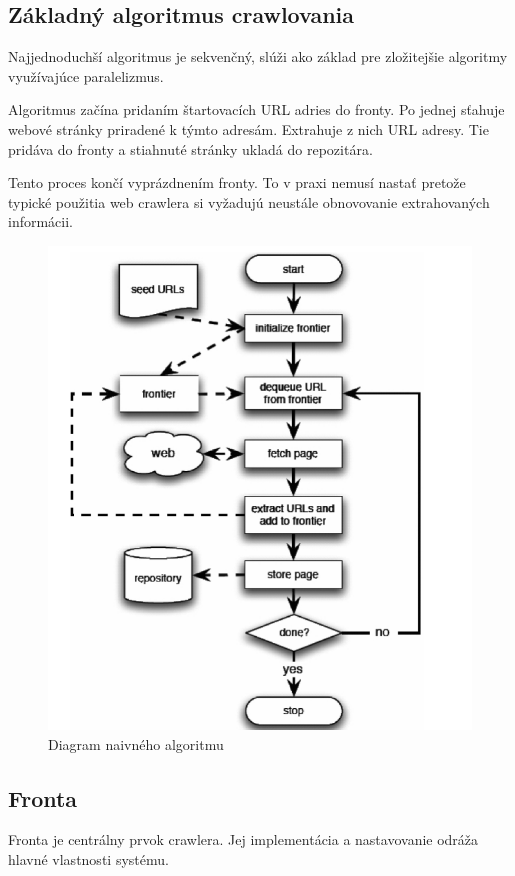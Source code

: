 \subsection{Základný algoritmus crawlovania}
Najjednoduchší algoritmus je sekvenčný, slúži ako základ pre zložitejšie algoritmy využívajúce paralelizmus. 

Algoritmus začína pridaním štartovacích URL adries do fronty. Po jednej sťahuje webové stránky priradené k týmto adresám. Extrahuje z nich URL adresy. Tie pridáva do fronty a stiahnuté stránky ukladá do repozitára.

Tento proces končí vyprázdnením fronty. To v praxi nemusí nastať pretože typické použitia web crawlera si vyžadujú neustále obnovovanie extrahovaných informácii.

\begin{figure}[!ht]
    \centering
    \includegraphics[width=.9\textwidth]{figures/basicCrawlAlgorithm.png}
    \caption{Diagram naivného algoritmu \label{o:basic_crawl_algorithm} \cite{dataMining}}
\end{figure}

\subsection{Fronta} 
Fronta je centrálny prvok crawlera. Jej implementácia a nastavovanie odráža hlavné vlastnosti systému. 

